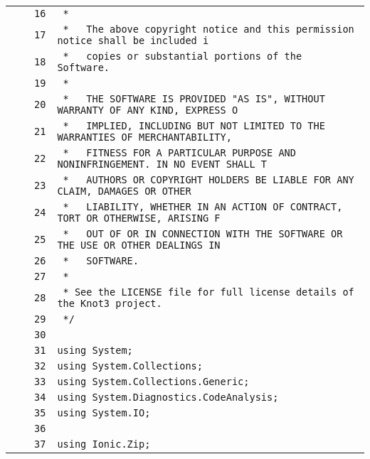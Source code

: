 \documentclass[a4paper,10pt]{article}
\begin{document}
\begin{longtable}[l]{lrrl}
\cellcolor{gray} &  & \verb~16~ & \verb~ *~\\
\cellcolor{gray} &  & \verb~17~ & \verb~ *   The above copyright notice and this permission notice shall be included i~\\
\cellcolor{gray} &  & \verb~18~ & \verb~ *   copies or substantial portions of the Software.~\\
\cellcolor{gray} &  & \verb~19~ & \verb~ *~\\
\cellcolor{gray} &  & \verb~20~ & \verb~ *   THE SOFTWARE IS PROVIDED "AS IS", WITHOUT WARRANTY OF ANY KIND, EXPRESS O~\\
\cellcolor{gray} &  & \verb~21~ & \verb~ *   IMPLIED, INCLUDING BUT NOT LIMITED TO THE WARRANTIES OF MERCHANTABILITY,~\\
\cellcolor{gray} &  & \verb~22~ & \verb~ *   FITNESS FOR A PARTICULAR PURPOSE AND NONINFRINGEMENT. IN NO EVENT SHALL T~\\
\cellcolor{gray} &  & \verb~23~ & \verb~ *   AUTHORS OR COPYRIGHT HOLDERS BE LIABLE FOR ANY CLAIM, DAMAGES OR OTHER~\\
\cellcolor{gray} &  & \verb~24~ & \verb~ *   LIABILITY, WHETHER IN AN ACTION OF CONTRACT, TORT OR OTHERWISE, ARISING F~\\
\cellcolor{gray} &  & \verb~25~ & \verb~ *   OUT OF OR IN CONNECTION WITH THE SOFTWARE OR THE USE OR OTHER DEALINGS IN~\\
\cellcolor{gray} &  & \verb~26~ & \verb~ *   SOFTWARE.~\\
\cellcolor{gray} &  & \verb~27~ & \verb~ *~\\
\cellcolor{gray} &  & \verb~28~ & \verb~ * See the LICENSE file for full license details of the Knot3 project.~\\
\cellcolor{gray} &  & \verb~29~ & \verb~ */~\\
\cellcolor{gray} &  & \verb~30~ & \verb~~\\
\cellcolor{gray} &  & \verb~31~ & \verb~using System;~\\
\cellcolor{gray} &  & \verb~32~ & \verb~using System.Collections;~\\
\cellcolor{gray} &  & \verb~33~ & \verb~using System.Collections.Generic;~\\
\cellcolor{gray} &  & \verb~34~ & \verb~using System.Diagnostics.CodeAnalysis;~\\
\cellcolor{gray} &  & \verb~35~ & \verb~using System.IO;~\\
\cellcolor{gray} &  & \verb~36~ & \verb~~\\
\cellcolor{gray} &  & \verb~37~ & \verb~using Ionic.Zip;~\\

\end{longtable}
\end{document}

